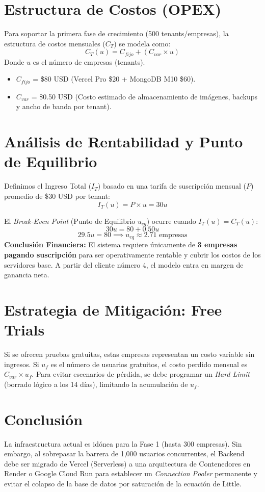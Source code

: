 \documentclass[12pt,a4paper]{article}
\begin{document}
\section{Estructura de Costos (OPEX)}
Para soportar la primera fase de crecimiento (500 tenants/empresas), la estructura de costos mensuales ($C_T$) se modela como:
\begin{equation}
    C_T(u) = C_{fijo} + (C_{var} \times u)
\end{equation}
Donde $u$ es el número de empresas (tenants).
\begin{itemize}
    \item $C_{fijo}$ = \$80 USD (Vercel Pro \$20 + MongoDB M10 \$60).
    \item $C_{var}$ = \$0.50 USD (Costo estimado de almacenamiento de imágenes, backups y ancho de banda por tenant).
\end{itemize}

\section{Análisis de Rentabilidad y Punto de Equilibrio}
Definimos el Ingreso Total ($I_T$) basado en una tarifa de suscripción mensual ($P$) promedio de \$30 USD por tenant:
\begin{equation}
    I_T(u) = P \times u = 30u
\end{equation}

El \textit{Break-Even Point} (Punto de Equilibrio $u_{eq}$) ocurre cuando $I_T(u) = C_T(u)$:
\begin{equation}
    30u = 80 + 0.50u
\end{equation}
\begin{equation}
    29.5u = 80 \implies u_{eq} \approx 2.71 \text{ empresas}
\end{equation}
\textbf{Conclusión Financiera:} El sistema requiere únicamente de \textbf{3 empresas pagando suscripción} para ser operativamente rentable y cubrir los costos de los servidores base. A partir del cliente número 4, el modelo entra en margen de ganancia neta.

\section{Estrategia de Mitigación: Free Trials}
Si se ofrecen pruebas gratuitas, estas empresas representan un costo variable sin ingresos. Si $u_f$ es el número de usuarios gratuitos, el costo perdido mensual es $C_{var} \times u_f$. 
Para evitar escenarios de pérdida, se debe programar un \textit{Hard Limit} (borrado lógico a los 14 días), limitando la acumulación de $u_f$.

\section{Conclusión}
La infraestructura actual es idónea para la Fase 1 (hasta 300 empresas). Sin embargo, al sobrepasar la barrera de 1,000 usuarios concurrentes, el Backend debe ser migrado de Vercel (Serverless) a una arquitectura de Contenedores en Render o Google Cloud Run para establecer un \textit{Connection Pooler} permanente y evitar el colapso de la base de datos por saturación de la ecuación de Little.
\end{document}
